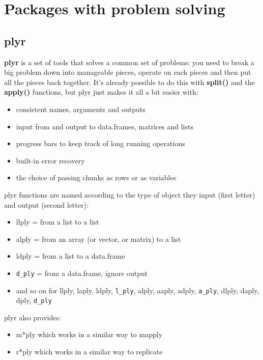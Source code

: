 \section{Packages with problem solving}
\label{sec:pack-with-probl}

\subsection{plyr}
\label{sec:plyr}

{\bf plyr} is a set of tools that solves a common set of problems: you
need to break a big problem down into manageable pieces, operate on
each pieces and then put all the pieces back together.  It's already
possible to do this with {\bf split()} and the {\bf apply()}
functions, but plyr just makes it all a bit easier with:

\begin{itemize}
\item consistent names, arguments and outputs

\item input from and output to data.frames, matrices and lists

\item progress bars to keep track of long running operations

\item built-in error recovery

\item the choice of passing chunks as rows or as variables
\end{itemize}

plyr functions are named according to the type of object they input
(first letter) and output (second letter):

\begin{itemize}
\item   llply = from a list to a list
\item  alply = from an array (or vector, or matrix) to a list
\item  ldply = from a list to a data.frame
\item   \verb!d_ply! = from a data.frame, ignore output
\item and so on for llply, laply, ldply, \verb!l_ply!, alply, aaply,
  adply, \verb!a_ply!, dlply, daply, dply, \verb!d_ply!
\end{itemize}

plyr also provides:

\begin{itemize}
\item    m*ply which works in a similar way to mapply
\item   r*ply which works in a similar way to replicate
\end{itemize}


